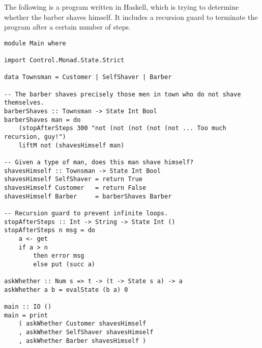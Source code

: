 \documentclass[11pt]{article}
\theoremstyle{plain}
\theoremstyle{definition}
\begin{document}
\noindent The following is a program written in Haskell, which is trying to determine whether the barber shaves himself. It includes a recursion guard to terminate the program after a certain number of steps.

\begin{verbatim}
module Main where

import Control.Monad.State.Strict

data Townsman = Customer | SelfShaver | Barber

-- The barber shaves precisely those men in town who do not shave themselves.
barberShaves :: Townsman -> State Int Bool
barberShaves man = do
    (stopAfterSteps 300 "not (not (not (not (not ... Too much recursion, guy!")
    liftM not (shavesHimself man)

-- Given a type of man, does this man shave himself?
shavesHimself :: Townsman -> State Int Bool
shavesHimself SelfShaver = return True
shavesHimself Customer   = return False
shavesHimself Barber     = barberShaves Barber

-- Recursion guard to prevent infinite loops.
stopAfterSteps :: Int -> String -> State Int ()
stopAfterSteps n msg = do
    a <- get
    if a > n
        then error msg
        else put (succ a)

askWhether :: Num s => t -> (t -> State s a) -> a
askWhether a b = evalState (b a) 0

main :: IO ()
main = print
    ( askWhether Customer shavesHimself 
    , askWhether SelfShaver shavesHimself 
    , askWhether Barber shavesHimself )
\end{verbatim}
\end{document}
